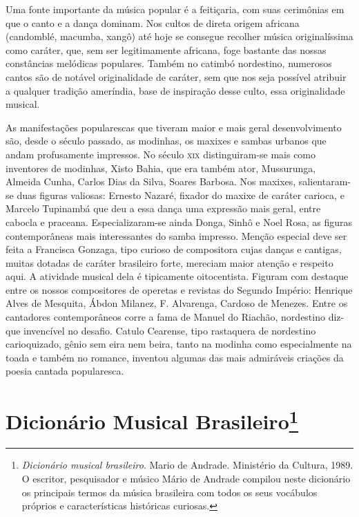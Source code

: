 Uma fonte importante da música popular é a feitiçaria, com suas
cerimônias em que o canto e a dança dominam. Nos cultos de direta origem
africana (candomblé, macumba, xangô) até hoje se consegue recolher
música originalíssima como caráter, que, sem ser legitimamente africana,
foge bastante das nossas constâncias melódicas populares. Também no
catimbó nordestino, numerosos cantos são de notável originalidade de
caráter, sem que nos seja possível atribuir a qualquer tradição
ameríndia, base de inspiração desse culto, essa originalidade musical.

As manifestações popularescas que tiveram maior e mais geral
desenvolvimento são, desde o século passado, as modinhas, os maxixes e
sambas urbanos que andam profusamente impressos. No século \textsc{xix}
distinguiram-se mais como inventores de modinhas, Xisto Bahia, que era
também ator, Mussurunga, Almeida Cunha, Carlos Dias da Silva, Soares
Barbosa. Nos maxixes, salientaram-se duas figuras valiosas: Ernesto
Nazaré, fixador do maxixe de caráter carioca, e Marcelo Tupinambá que
deu a essa dança uma expressão mais geral, entre cabocla e praceana.
Especializaram-se ainda Donga, Sinhô e Noel Rosa, as figuras
contemporâneas mais interessantes do samba impresso. Menção especial
deve ser feita a Francisca Gonzaga, tipo curioso de compositora cujas
danças e cantigas, muitas dotadas de caráter brasileiro forte, mereciam
maior atenção e respeito aqui. A atividade musical dela é tipicamente
oitocentista. Figuram com destaque entre os nossos compositores de
operetas e revistas do Segundo Império: Henrique Alves de Mesquita,
Ábdon Milanez, F. Alvarenga, Cardoso de Menezes. Entre os cantadores
contemporâneos corre a fama de Manuel do Riachão, nordestino diz-que
invencível no desafio. Catulo Cearense, tipo rastaquera de nordestino
carioquizado, gênio sem eira nem beira, tanto na modinha como
especialmente na toada e também no romance, inventou algumas das mais
admiráveis criações da poesia cantada popularesca.



\chapter{Dicionário Musical Brasileiro\footnote{\emph{Dicionário musical brasileiro}. Mario de Andrade. Ministério da
Cultura, 1989.\\
O escritor, pesquisador e músico Mário de Andrade
compilou neste dicionário os principais termos da música brasileira com
todos os seus vocábulos próprios e características históricas curiosas.}}



